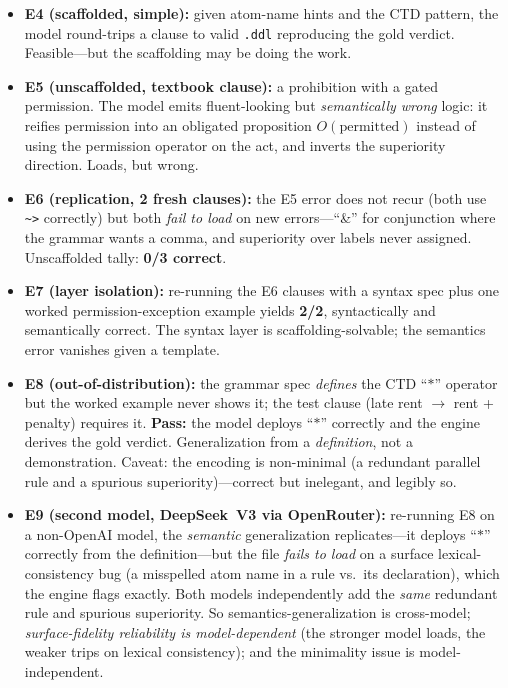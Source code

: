 \begin{itemize}
\item \textbf{E4 (scaffolded, simple):} given atom-name hints and the CTD pattern,
the model round-trips a clause to valid \texttt{.ddl} reproducing the gold verdict. Feasible---but
the scaffolding may be doing the work.
\item \textbf{E5 (unscaffolded, textbook clause):} a prohibition with a gated permission.
The model emits fluent-looking but \emph{semantically wrong} logic: it reifies permission
into an obligated proposition $O(\text{permitted})$ instead of using the permission operator
on the act, and inverts the superiority direction. Loads, but wrong.
\item \textbf{E6 (replication, 2 fresh clauses):} the E5 error does not recur (both use
\texttt{\textasciitilde>} correctly) but both \emph{fail to load} on new errors---``\&'' for
conjunction where the grammar wants a comma, and superiority over labels never assigned.
Unscaffolded tally: \textbf{0/3 correct}.
\item \textbf{E7 (layer isolation):} re-running the E6 clauses with a syntax spec plus one
worked permission-exception example yields \textbf{2/2}, syntactically and semantically
correct. The syntax layer is scaffolding-solvable; the semantics error vanishes given a
template.
\item \textbf{E8 (out-of-distribution):} the grammar spec \emph{defines} the CTD ``$*$''
operator but the worked example never shows it; the test clause (late rent $\rightarrow$
rent + penalty) requires it. \textbf{Pass:} the model deploys ``$*$'' correctly and the
engine derives the gold verdict. Generalization from a \emph{definition}, not a demonstration.
Caveat: the encoding is non-minimal (a redundant parallel rule and a spurious superiority)---correct
but inelegant, and legibly so.
\item \textbf{E9 (second model, DeepSeek~V3 via OpenRouter):} re-running E8 on a non-OpenAI
model, the \emph{semantic} generalization replicates---it deploys ``$*$'' correctly from the
definition---but the file \emph{fails to load} on a surface lexical-consistency bug (a misspelled
atom name in a rule vs.\ its declaration), which the engine flags exactly. Both models independently
add the \emph{same} redundant rule and spurious superiority. So semantics-generalization is
cross-model; \emph{surface-fidelity reliability is model-dependent} (the stronger model loads, the
weaker trips on lexical consistency); and the minimality issue is model-independent.
\end{itemize}

